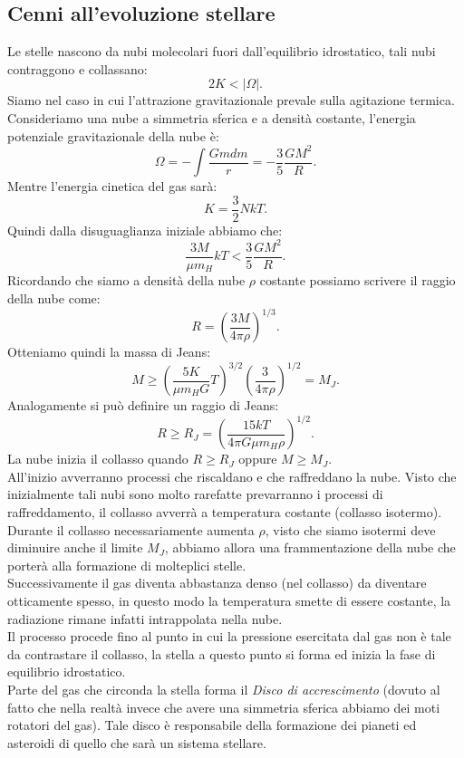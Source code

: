 \subsection{Cenni all'evoluzione stellare}%
\label{sub:Cenni all'evoluzione stellare}
Le stelle nascono da nubi molecolari fuori dall'equilibrio idrostatico, tali nubi contraggono e collassano:
\[
    2K< \left|\Omega\right|
.\] 
Siamo nel caso in cui l'attrazione gravitazionale prevale sulla agitazione termica.\\
Consideriamo una nube a simmetria sferica e a densità costante, l'energia potenziale gravitazionale della nube è:
\[
    \Omega = - \int   \frac{Gmdm}{r} = 
    -\frac{3}{5}\frac{GM^2}{R}
.\] 
Mentre l'energia cinetica del gas sarà:
\[
    K = \frac{3}{2}NkT 
.\]  
Quindi dalla disuguaglianza iniziale abbiamo che:
\[
    \frac{3M}{\mu m_H}kT < \frac{3}{5} \frac{GM^2}{R}
.\] 
Ricordando che siamo a densità della nube $\rho$ costante possiamo scrivere il raggio della nube come:
\[
    R = \left(\frac{3M}{4\pi\rho}\right)^{1 /3}
.\] 
Otteniamo quindi la massa di Jeans:
\[
    M \ge
    \left(\frac{5K}{\mu m_HG}T\right)^{3 /2}
    \left(\frac{3}{4\pi\rho}\right)^{1 /2} = M_J
.\] 
Analogamente si può definire un raggio di Jeans:
\[
    R \ge R_J = \left(\frac{15kT}{4\pi G\mu m_H \rho}\right)^{1/2}
.\] 
La nube inizia il collasso quando $R \ge R_J$ oppure $M\ge M_J$.\\
All'inizio avverranno processi che riscaldano e che raffreddano la nube. 
Visto che inizialmente tali nubi sono molto rarefatte prevarranno i processi di raffreddamento, il collasso avverrà a temperatura costante (collasso isotermo).\\
Durante il collasso necessariamente aumenta $\rho$, visto che siamo isotermi deve diminuire anche il limite $M_J$, abbiamo allora una frammentazione della nube che porterà alla formazione di molteplici stelle.\\
Successivamente il gas diventa abbastanza denso (nel collasso) da diventare otticamente spesso, in questo modo la temperatura smette di essere costante, la radiazione rimane infatti intrappolata nella nube.\\
Il processo procede fino al punto in cui la pressione esercitata dal gas non è tale da contrastare il collasso, la stella a questo punto si forma ed inizia la fase di equilibrio idrostatico.\\
Parte del gas che circonda la stella forma il \textit{Disco di accrescimento} (dovuto al fatto che nella realtà invece che avere una simmetria sferica abbiamo dei moti rotatori del gas). Tale disco è responsabile della formazione dei pianeti ed asteroidi di quello che sarà un sistema stellare.
